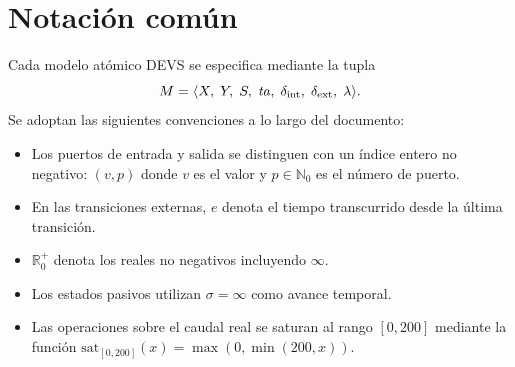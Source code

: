 \section{Notación común}

Cada modelo atómico DEVS se especifica mediante la tupla
\[
  M = \langle X,\; Y,\; S,\; \mathit{ta},\; \delta_{\mathrm{int}},\; \delta_{\mathrm{ext}},\; \lambda \rangle.
\]
Se adoptan las siguientes convenciones a lo largo del documento:

\begin{itemize}
  \item Los puertos de entrada y salida se distinguen con un índice entero
        no negativo: $(v, p)$ donde $v$ es el valor y $p \in \mathbb{N}_0$
        es el número de puerto.
  \item En las transiciones externas, $e$ denota el tiempo transcurrido desde
        la última transición.
  \item $\mathbb{R}_0^+$ denota los reales no negativos incluyendo $\infty$.
  \item Los estados pasivos utilizan $\sigma = \infty$ como avance temporal.
  \item Las operaciones sobre el caudal real se saturan al rango $[0, 200]$
        mediante la función $\mathrm{sat}_{[0,200]}(x) = \max(0, \min(200, x))$.
\end{itemize}
